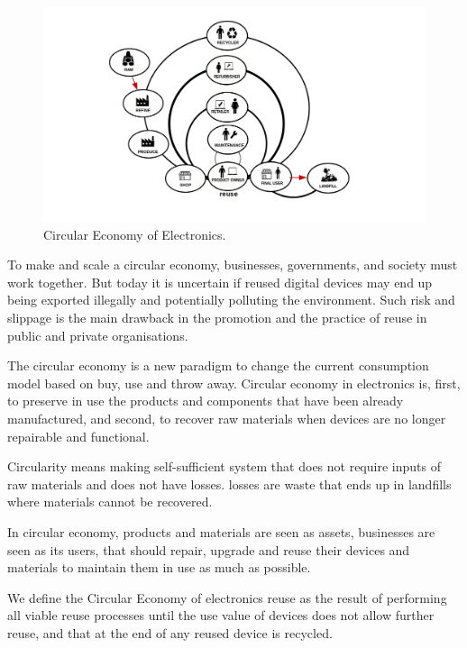 \documentclass[
]{book}
\begin{document}
\begin{figure}

{\centering \includegraphics[width=1\linewidth]{./figs/26} 

}

\caption{Circular Economy of Electronics.}\label{fig:figcirculareconomy}
\end{figure}

To make and scale a circular economy, businesses, governments, and society must work together. But today it is uncertain if reused digital devices may end up being exported illegally and potentially polluting the environment. Such risk and slippage is the main drawback in the promotion and the practice of reuse in public and private organisations.

The circular economy is a new paradigm to change the current consumption model based on buy, use and throw away. Circular economy in electronics is, first, to preserve in use the products and components that have been already manufactured, and second, to recover raw materials when devices are no longer repairable and functional.

Circularity means making self-sufficient system that does not require inputs of raw materials and does not have losses. losses are waste that ends up in landfills where materials cannot be recovered.

In circular economy, products and materials are seen as assets, businesses are seen as its users, that should repair, upgrade and reuse their devices and materials to maintain them in use as much as possible.

We define the Circular Economy of electronics reuse as the result of performing all viable reuse processes until the use value of devices does not allow further reuse, and that at the end of any reused device is recycled.
\end{document}
